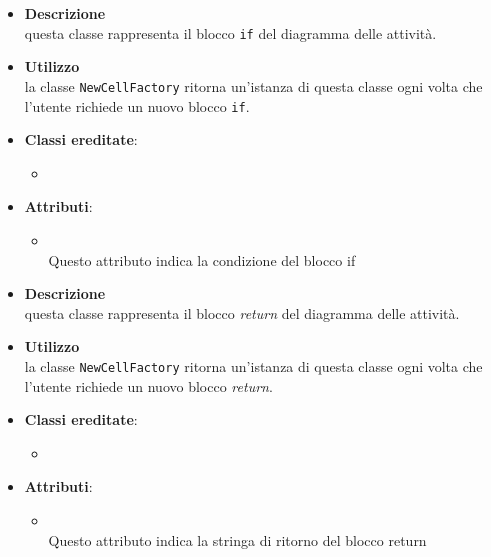 \label{\nogloxy{swedesigner::client::model::celltypes::activity::HxIf}}
\begin{itemize}
\item \textbf{Descrizione}\\
questa classe rappresenta il blocco \texttt{if} del diagramma delle attività.
\item \textbf{Utilizzo}\\
la classe \texttt{NewCellFactory} ritorna un'istanza di questa classe ogni volta che l'utente richiede un nuovo blocco \texttt{if}.
\item \textbf{Classi ereditate}:
\begin{itemize}
\item \hyperref[\nogloxy{swedesigner::client::model::celltypes::activity::ActivityDiagramElement}]{}
\end{itemize}
\item \textbf{Attributi}:
\begin{itemize}
\item {}
\\ Questo attributo indica la condizione del blocco if
\end{itemize}
\end{itemize}

\label{\nogloxy{swedesigner::client::model::celltypes::activity::HxReturn}}
\begin{itemize}
\item \textbf{Descrizione}\\
questa classe rappresenta il blocco \emph{return} del diagramma delle attività.
\item \textbf{Utilizzo}\\
la classe \texttt{NewCellFactory} ritorna un'istanza di questa classe ogni volta che l'utente richiede un nuovo blocco \emph{return}.
\item \textbf{Classi ereditate}:
\begin{itemize}
\item \hyperref[\nogloxy{swedesigner::client::model::celltypes::activity::ActivityDiagramElement}]{}
\end{itemize}
\item \textbf{Attributi}:
\begin{itemize}
\item {}
\\ Questo attributo indica la stringa di ritorno del blocco return
\end{itemize}
\end{itemize}

